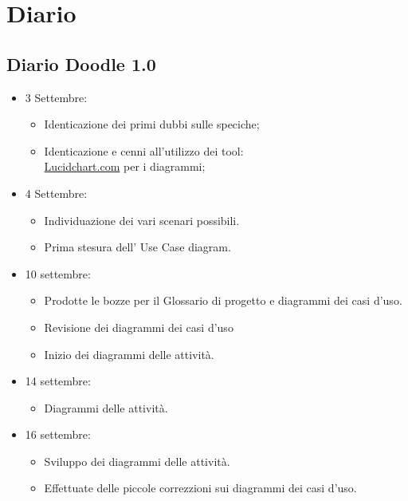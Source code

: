 \chapter{Diario}
\section{Diario Doodle 1.0}
\begin{itemize}
\item 3 Settembre: 	
	\begin{itemize}
			\item Identicazione dei primi dubbi sulle speciche;
			\item Identicazione e cenni all'utilizzo dei tool: \\
	
	\href{https:www.lucidchart.com}{Lucidchart.com} per i diagrammi;
	\end{itemize}
	
\item 4 Settembre:
	\begin{itemize} 
		\item Individuazione dei vari scenari possibili.
		\item Prima stesura dell' Use Case diagram. 
		
	 \end{itemize}

\item 10 settembre:
\begin{itemize} 
	\item Prodotte le bozze per il Glossario di progetto e diagrammi dei casi d'uso.
	\item Revisione dei diagrammi dei casi d'uso
	\item Inizio dei diagrammi delle attività.
	
\end{itemize}

\item 14 settembre:
\begin{itemize} 
	\item Diagrammi delle attività.
\end{itemize}

\item 16 settembre:
\begin{itemize} 
	\item Sviluppo dei  diagrammi delle attività. 
	\item Effettuate delle piccole correzzioni sui diagrammi dei casi d'uso.
	

\end{itemize}
\end{itemize}
